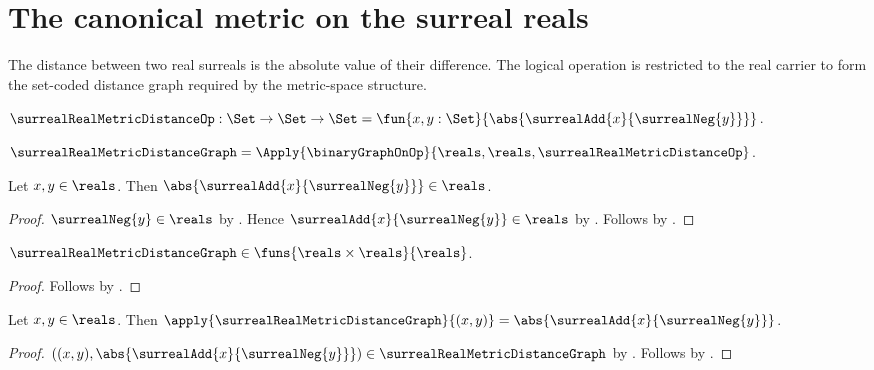 



\section{The canonical metric on the surreal reals}

The distance between two real surreals is the absolute value of their
difference.  The logical operation is restricted to the real carrier to form
the set-coded distance graph required by the metric-space structure.

\begin{definition}\label{surreal_real_metric_distance_op}
    $\surrealRealMetricDistanceOp:\Set\to\Set\to\Set
        =\fun{x,y:\Set}{
            \abs{\surrealAdd{x}{\surrealNeg{y}}}}$.
\end{definition}

\begin{definition}\label{surreal_real_metric_distance_graph}
    $\surrealRealMetricDistanceGraph=
        \Apply{\binaryGraphOnOp}
            {\reals,\reals,\surrealRealMetricDistanceOp}$.
\end{definition}

\begin{proposition}\label{surreal_real_metric_difference_closed}
    Let $x,y\in\reals$.
    Then $\abs{\surrealAdd{x}{\surrealNeg{y}}}\in\reals$.
\end{proposition}
\begin{proof}
    $\surrealNeg{y}\in\reals$
        by .
    Hence $\surrealAdd{x}{\surrealNeg{y}}\in\reals$
        by .
    Follows by .
\end{proof}

\begin{proposition}\label{surreal_real_metric_distance_graph_type}
    $\surrealRealMetricDistanceGraph
        \in\funs{\reals\times\reals}{\reals}$.
\end{proposition}
\begin{proof}
    Follows by
        .
\end{proof}

\begin{proposition}\label{surreal_real_metric_distance_graph_application}
    Let $x,y\in\reals$.
    Then
        $\apply{\surrealRealMetricDistanceGraph}{(x,y)}
            =\abs{\surrealAdd{x}{\surrealNeg{y}}}$.
\end{proposition}
\begin{proof}
    $((x,y),\abs{\surrealAdd{x}{\surrealNeg{y}}})
        \in\surrealRealMetricDistanceGraph$
        by
        .
    Follows by
        .
\end{proof}

